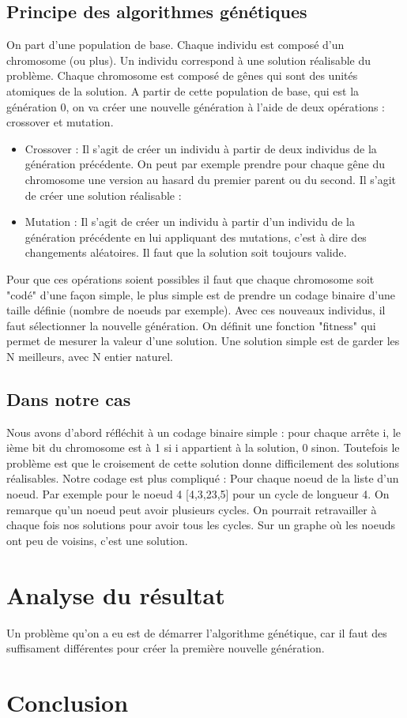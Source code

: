 \documentclass[frenchb]{article}
\begin{document}
                        \subsection{Principe des algorithmes génétiques}
                        On part d'une population de base. Chaque individu est composé d'un chromosome (ou plus). Un individu correspond à une solution réalisable du problème. Chaque chromosome est composé de gênes qui sont des unités atomiques de la solution.
                        A partir de cette population de base, qui est la génération 0, on va créer une nouvelle génération à l'aide de deux opérations : crossover et mutation.
                        \begin{itemize}
                         \item Crossover : Il s'agit de créer un individu à partir de deux individus de la génération précédente. On peut par exemple prendre pour chaque gêne du chromosome une version au hasard du premier parent ou du second. Il s'agit de créer une solution réalisable :
                         \item Mutation : Il s'agit de créer un individu à partir d'un individu de la génération précédente en lui appliquant des mutations, c'est à dire des changements aléatoires. Il faut que la solution soit toujours valide. \\\end{itemize}
                   
                        Pour que ces opérations soient possibles il faut que chaque chromosome soit "codé" d'une façon simple, le plus simple est de prendre un codage binaire d'une taille définie (nombre de noeuds par exemple).
                        Avec ces nouveaux individus, il faut sélectionner la nouvelle génération. On définit une fonction "fitness" qui permet de mesurer la valeur d'une solution. Une solution simple est de garder les N meilleurs, avec N entier naturel.


                       \subsection {Dans notre cas}
                        Nous avons d'abord réfléchit à un codage binaire simple : pour chaque arrête i, le ième bit du chromosome est à 1 si i appartient à la solution, 0 sinon. Toutefois le problème est que le croisement de cette solution donne difficilement des solutions réalisables. 
                        Notre codage est plus compliqué : Pour chaque noeud de la liste d'un noeud. Par exemple pour le noeud 4 [4,3,23,5] pour un cycle de longueur 4.
                        On remarque qu'un noeud peut avoir plusieurs cycles. On pourrait retravailler à chaque fois nos solutions pour avoir tous les cycles. Sur un graphe où les noeuds ont peu de voisins, c'est une solution.
                        \section{Analyse du résultat}
                        Un problème qu'on a eu est de démarrer l'algorithme génétique, car il faut des suffisament différentes pour créer la première nouvelle génération.
			\section{Conclusion}
				
				
			
\end{document}
